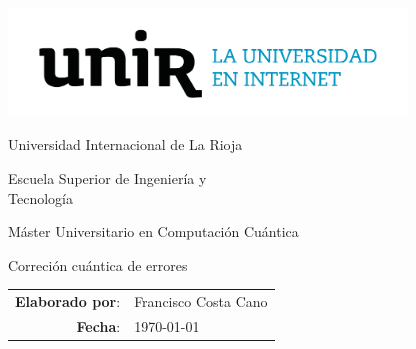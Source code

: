 \begin{center}
	\includegraphics[width=10.6cm,height=2.88cm]{logo}

	\Huge Universidad Internacional de La Rioja

	\huge Escuela Superior de Ingeniería y \\ Tecnología

	\vspace{100pt}

	\LARGE Máster Universitario en Computación Cuántica

	\Huge \textcolor{unir-azul-fuerte}{Correción cuántica de errores}
	\normalsize

	\vspace{100pt}

\end{center}
\begin{tabular}{rl}
	\textbf{Elaborado por}: & Francisco Costa Cano \\
	\textbf{Fecha}:         & \today             \\
\end{tabular}
\newpage